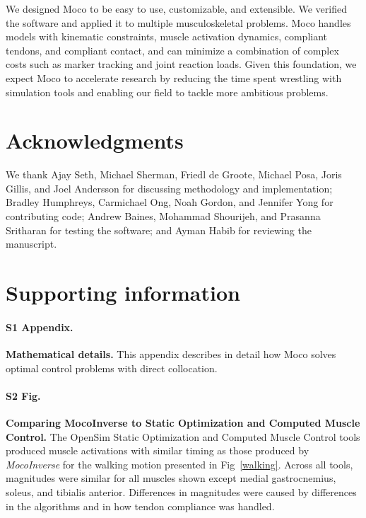 \documentclass[10pt,letterpaper]{article}
\begin{document}
We designed Moco to be easy to use, customizable, and extensible. We verified the software and applied it to multiple musculoskeletal problems. Moco handles models with kinematic constraints, muscle activation dynamics, compliant tendons, and compliant contact, and can minimize a combination of complex costs such as marker tracking and joint reaction loads. Given this foundation, we expect Moco to accelerate research by reducing the time spent wrestling with simulation tools and enabling our field to tackle more ambitious problems.

\section*{Acknowledgments}

We thank Ajay Seth, Michael Sherman, Friedl de Groote, Michael Posa, Joris Gillis, and Joel Andersson for discussing methodology and implementation; Bradley Humphreys, Carmichael Ong, Noah Gordon, and Jennifer Yong for contributing code; Andrew Baines, Mohammad Shourijeh, and Prasanna Sritharan for testing the software; and Ayman Habib for reviewing the manuscript.

\section*{Supporting information}

\paragraph*{S1 Appendix.}
\label{S1_Appendix}
{\bf Mathematical details.} This appendix describes in detail how Moco solves optimal control problems with direct collocation.

\paragraph*{S2 Fig.}
\label{S2_Fig}
{\bf Comparing MocoInverse to Static Optimization and Computed Muscle Control.} The OpenSim Static Optimization and Computed Muscle Control tools produced muscle activations with similar timing as those produced by \textit{MocoInverse} for the walking motion presented in Fig~\ref{walking}. Across all tools, magnitudes were similar for all muscles shown except medial gastrocnemius, soleus, and tibialis anterior. Differences in magnitudes were caused by differences in the algorithms and in how tendon compliance was handled.
\end{document}
